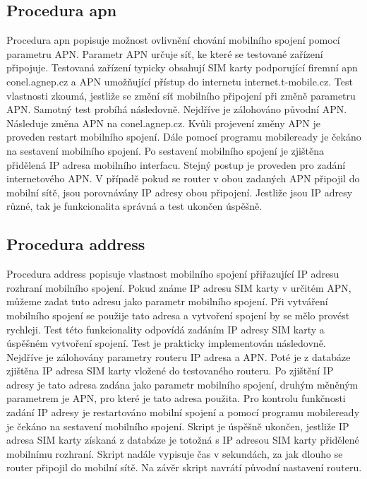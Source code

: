 \subsection{Procedura apn}
Procedura apn popisuje možnost ovlivnění chování mobilního spojení pomocí parametru APN. Parametr APN určuje síť, ke které se testované zařízení připojuje. Testovaná zařízení typicky obsahují SIM karty podporující firemní apn conel.agnep.cz a APN umožňující přístup do internetu internet.t-mobile.cz. Test vlastnosti zkoumá, jestliže se změní síť mobilního připojení při změně parametru APN. Samotný test probíhá následovně. Nejdříve je zálohováno původní APN. Následuje změna APN na conel.agnep.cz. Kvůli projevení změny APN je proveden restart mobilního spojení. Dále pomocí programu mobileready je čekáno na sestavení mobilního spojení. Po sestavení mobilního spojení je zjištěna přidělená IP adresa mobilního interfacu. Stejný postup je proveden pro zadání internetového APN. V případě pokud se router v obou zadaných APN připojil do mobilní sítě, jsou porovnávány IP adresy obou připojení. Jestliže jsou IP adresy různé, tak je funkcionalita správná a test ukončen úspěšně.

\subsection{Procedura address}
Procedura address popisuje vlastnost mobilního spojení přiřazující IP adresu rozhraní mobilního spojení. Pokud známe IP adresu SIM karty v určitém APN, můžeme zadat tuto adresu jako parametr mobilního spojení. Při vytváření mobilního spojení se použije tato adresa a vytvoření spojení by se mělo provést rychleji. Test této funkcionality odpovídá zadáním IP adresy SIM karty a úspěšném vytvoření spojení. Test je prakticky implementován následovně. Nejdříve je zálohovány parametry routeru IP adresa a APN. Poté je z databáze zjištěna IP adresa SIM karty vložené do testovaného routeru. Po zjištění IP adresy je tato adresa zadána jako parametr mobilního spojení, druhým měněným parametrem je APN, pro které je tato adresa použita. Pro kontrolu funkčnosti zadání IP adresy je restartováno mobilní spojení a pomocí programu mobileready je čekáno na sestavení mobilního spojení. Skript je úspěšně ukončen, jestliže IP adresa SIM karty získaná z databáze je totožná s IP adresou SIM karty přidělené mobilnímu rozhraní. Skript nadále vypisuje čas v sekundách, za jak dlouho se router připojil do mobilní sítě. Na závěr skript navrátí původní nastavení routeru.


